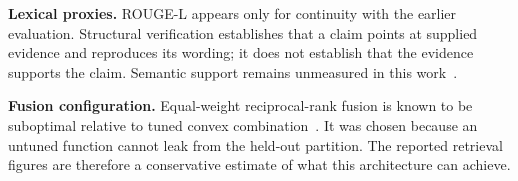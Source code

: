 \textbf{Lexical proxies.} ROUGE-L appears only for continuity with the earlier
evaluation. Structural verification establishes that a claim points at supplied
evidence and reproduces its wording; it does not establish that the evidence
supports the claim. Semantic support remains unmeasured in this
work~\cite{rashkin2023attribution,liu2023verifiability}.

\textbf{Fusion configuration.} Equal-weight reciprocal-rank fusion is known to be
suboptimal relative to tuned convex combination~\cite{bruch2024fusion}. It was
chosen because an untuned function cannot leak from the held-out partition. The
reported retrieval figures are therefore a conservative estimate of what this
architecture can achieve.
